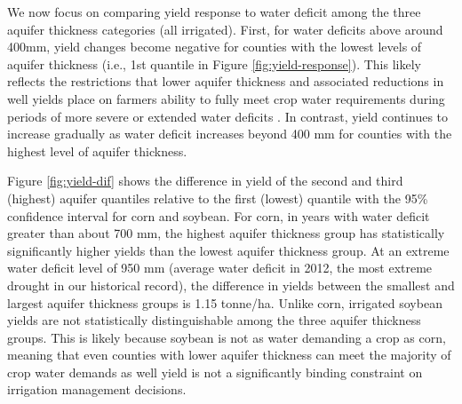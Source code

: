 \documentclass[
]{article}
\begin{document}
We now focus on comparing yield response to water deficit among the three aquifer thickness categories (all irrigated). First, for water deficits above around 400mm, yield changes become negative for counties with the lowest levels of aquifer thickness (i.e., 1st quantile in Figure \ref{fig:yield-response}). This likely reflects the restrictions that lower aquifer thickness and associated reductions in well yields place on farmers ability to fully meet crop water requirements during periods of more severe or extended water deficits \citetext{\citealp[\citet{foster2014modeling}]{rad2020effects}; \citealp{hrozencik2017heterogeneous}}. In contrast, yield continues to increase gradually as water deficit increases beyond 400 mm for counties with the highest level of aquifer thickness.

Figure \ref{fig:yield-dif} shows the difference in yield of the second and third (highest) aquifer quantiles relative to the first (lowest) quantile with the 95\% confidence interval for corn and soybean. For corn, in years with water deficit greater than about 700 mm, the highest aquifer thickness group has statistically significantly higher yields than the lowest aquifer thickness group. At an extreme water deficit level of 950 mm (average water deficit in 2012, the most extreme drought in our historical record), the difference in yields between the smallest and largest aquifer thickness groups is 1.15 tonne/ha. Unlike corn, irrigated soybean yields are not statistically distinguishable among the three aquifer thickness groups. This is likely because soybean is not as water demanding a crop as corn, meaning that even counties with lower aquifer thickness can meet the majority of crop water demands as well yield is not a significantly binding constraint on irrigation management decisions.
\end{document}
